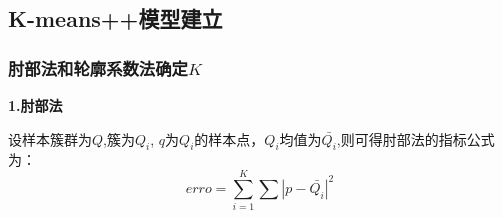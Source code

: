 \documentclass[UTF8]{ctexart}
\begin{document}
















\subsection{K-means++模型建立}
\subsubsection{肘部法和轮廓系数法确定$K$}
\textbf{1.肘部法}

设样本簇群为$Q$,簇为$Q_i$, $q$为$Q_i$的样本点，$Q_i$均值为$\bar{Q_i}$,则可得肘部法的指标公式为：
\begin{equation}
	erro = \sum _{i=1} ^K \sum\left\lvert p-\bar{Q_i} \right\rvert ^2
\end{equation}
\end{document}
